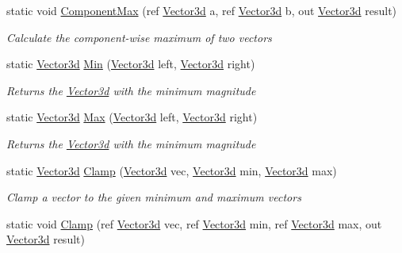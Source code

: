 \begin{DoxyCompactItemize}
static void \hyperlink{struct_open_t_k_1_1_vector3d_a7595f16dd6bd992c0927567abdbd64b6}{Component\-Max} (ref \hyperlink{struct_open_t_k_1_1_vector3d}{Vector3d} a, ref \hyperlink{struct_open_t_k_1_1_vector3d}{Vector3d} b, out \hyperlink{struct_open_t_k_1_1_vector3d}{Vector3d} result)
\begin{DoxyCompactList}\small\item\em Calculate the component-\/wise maximum of two vectors \end{DoxyCompactList}\item 
static \hyperlink{struct_open_t_k_1_1_vector3d}{Vector3d} \hyperlink{struct_open_t_k_1_1_vector3d_a6da3a63025e7c6eb996a3437b312a7ed}{Min} (\hyperlink{struct_open_t_k_1_1_vector3d}{Vector3d} left, \hyperlink{struct_open_t_k_1_1_vector3d}{Vector3d} right)
\begin{DoxyCompactList}\small\item\em Returns the \hyperlink{struct_open_t_k_1_1_vector3d}{Vector3d} with the minimum magnitude \end{DoxyCompactList}\item 
static \hyperlink{struct_open_t_k_1_1_vector3d}{Vector3d} \hyperlink{struct_open_t_k_1_1_vector3d_a4e45c635ab5ef76f811381bd006c11af}{Max} (\hyperlink{struct_open_t_k_1_1_vector3d}{Vector3d} left, \hyperlink{struct_open_t_k_1_1_vector3d}{Vector3d} right)
\begin{DoxyCompactList}\small\item\em Returns the \hyperlink{struct_open_t_k_1_1_vector3d}{Vector3d} with the minimum magnitude \end{DoxyCompactList}\item 
static \hyperlink{struct_open_t_k_1_1_vector3d}{Vector3d} \hyperlink{struct_open_t_k_1_1_vector3d_ae9a2d2346830c76998265c5d77ebece7}{Clamp} (\hyperlink{struct_open_t_k_1_1_vector3d}{Vector3d} vec, \hyperlink{struct_open_t_k_1_1_vector3d}{Vector3d} min, \hyperlink{struct_open_t_k_1_1_vector3d}{Vector3d} max)
\begin{DoxyCompactList}\small\item\em Clamp a vector to the given minimum and maximum vectors \end{DoxyCompactList}\item 
static void \hyperlink{struct_open_t_k_1_1_vector3d_ac96aa54f03a61f6c3a022d37e0316dee}{Clamp} (ref \hyperlink{struct_open_t_k_1_1_vector3d}{Vector3d} vec, ref \hyperlink{struct_open_t_k_1_1_vector3d}{Vector3d} min, ref \hyperlink{struct_open_t_k_1_1_vector3d}{Vector3d} max, out \hyperlink{struct_open_t_k_1_1_vector3d}{Vector3d} result)

\end{DoxyCompactItemize}
